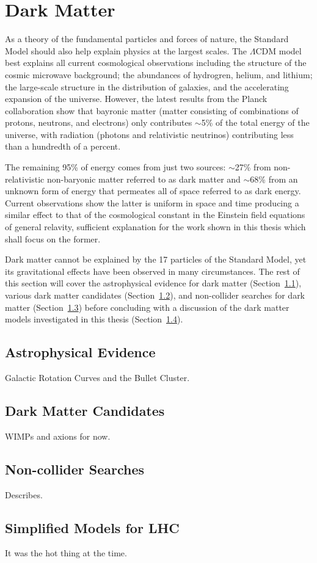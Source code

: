 \newpage

\section{Dark Matter}
\label{sec:dm}

As a theory of the fundamental particles and forces of nature, the Standard Model should also help explain physics at the largest scales.
The $\Lambda$CDM model best explains all current cosmological observations including the structure of the cosmic microwave background; the abundances of hydrogren, helium, and lithium; the large-scale structure in the distribution of galaxies, and the accelerating expansion of the universe.
However, the latest results from the Planck collaboration show that bayronic matter (matter consisting of combinations of protons, neutrons, and electrons) only contributes $\sim$5\% of the total energy of the universe, with radiation (photons and relativistic neutrinos) contributing less than a hundredth of a percent.

The remaining 95\% of energy comes from just two sources: $\sim$27\% from non-relativistic non-baryonic matter referred to as dark matter and $\sim$68\% from an unknown form of energy that permeates all of space referred to as dark energy.
Current observations show the latter is uniform in space and time producing a similar effect to that of the cosmological constant in the Einstein field equations of general relavity, sufficient explanation for the work shown in this thesis which shall focus on the former.

Dark matter cannot be explained by the 17 particles of the Standard Model, yet its gravitational effects have been observed in many circumstances. The rest of this section will cover the astrophysical evidence for dark matter (Section~\ref{sec:dm_astro}), various dark matter candidates (Section~\ref{sec:dm_cand}), and non-collider searches for dark matter (Section~\ref{sec:dm_search}) before concluding with a discussion of the dark matter models investigated in this thesis (Section~\ref{sec:dm_simp}).

\subsection{Astrophysical Evidence}
\label{sec:dm_astro}

Galactic Rotation Curves and the Bullet Cluster.

\subsection{Dark Matter Candidates}
\label{sec:dm_cand}

WIMPs and axions for now.

\subsection{Non-collider Searches}
\label{sec:dm_search}

Describes.

\subsection{Simplified Models for LHC}
\label{sec:dm_simp}

It was the hot thing at the time.
